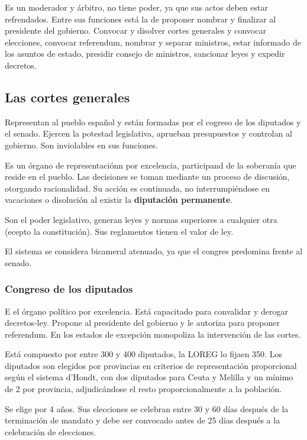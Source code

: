         Es un moderador y árbitro, no tiene poder, ya que sus actos deben estar refrendados. Entre sus funciones está la de proponer nombrar y finalizar al presidente del gobierno. Convocar y disolver cortes generales y convocar elecciones, convocar referendum, nombrar y separar ministros, estar informado de los asuntos de estado, presidir consejo de ministros, sancionar leyes y expedir decretos.



\subsection{Las cortes generales}
    Representan al pueblo español y están formadas por el cogreso de los diputados y el senado. Ejercen la potestad legislativa, aprueban presupuestos y controlan al gobierno. Son inviolables en sus funciones.

    Es un órgano de representaciónn por excelencia, participand de la soberanía que reside en el pueblo. Las decisiones se toman mediante un proceso de discusión, otorgando racionalidad. Su acción es continuada, no interrumpiéndose en vacaciones o disolución al existir la \textbf{diputación permanente}.

    Son el poder legislativo, generan leyes y normas superiores a cualquier otra (ecepto la constitución). Sus reglamentos tienen el valor de ley. 
    
    El sistema se considera bicameral atenuado, ya que el congres predomina frente al senado.
    
    \subsubsection{Congreso de los diputados}
        E el órgano político por excelencia. Está capacitado para convalidar y derogar decretos-ley. Propone al presidente del gobierno y le autoriza para proponer referendum. En los estados de excepción monopoliza la intervención de las cortes.

        Está compuesto por entre 300 y 400 diputados, la LOREG lo fijaen 350. Los diputados son elegidos por provincias en criterios de representación proporcional según el sistema d'Hondt, con dos diputados para Ceuta y Melilla y un mínimo de 2 por provincia, adjudicándose el resto proporcionalmente a la población.

        Se elige por 4 años. Sus elecciones se celebran entre 30 y 60 días después de la terminación de mandato y debe ser convocado antes de 25 días después a la celebración de elecciones.

